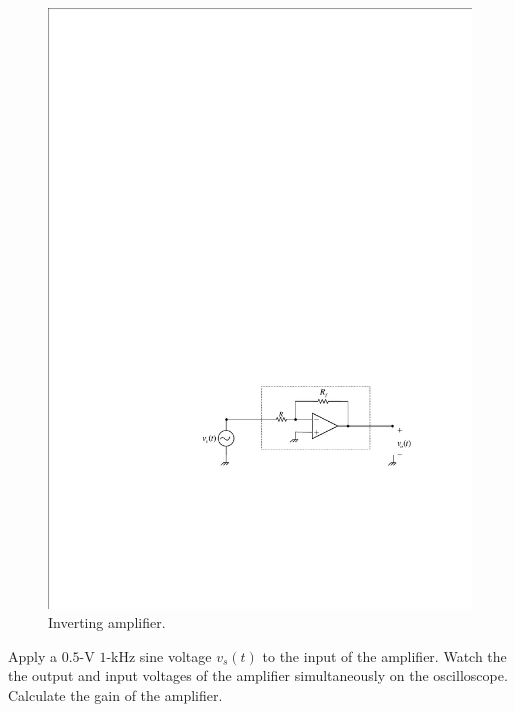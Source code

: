 \documentclass[11pt]{article}
\begin{document}

\begin{question}


\begin{figure}[H]
\centering
\includegraphics[scale=1.2,angle=0]{Fig/cir3.pdf}
\caption{Inverting amplifier.} \label{fig:cir3}
\end{figure}

\begin{subquestion}{Apply a $0.5$-V $1$-kHz sine voltage $v_{s}(t)$ to the input of the amplifier. Watch the the output and input voltages of the amplifier simultaneously on the oscilloscope. Calculate the gain of the amplifier.} 
\answer{}
\end{subquestion}


\end{question}
\end{document}
